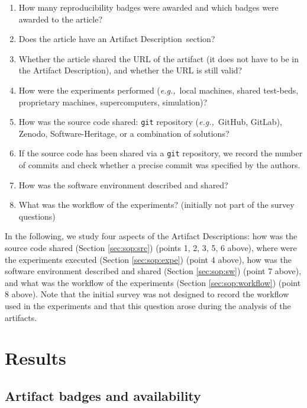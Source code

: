 \documentclass[sigconf,natbib=false]{acmart}
\newcommand{\eg}{\emph{e.g.,}}
\newcommand{\ad}{Artifact Description}
\begin{document}

\begin{enumerate}
  \item How many reproducibility badges were awarded and which badges were awarded to the article?
  \item Does the article have an \ad\ section?
  \item Whether the article shared the URL of the artifact (it does not have to be in the \ad), and whether the URL is still valid?
  \item How were the experiments performed (\eg\ local machines, shared test-beds, proprietary machines, supercomputers, simulation)?
  \item How was the source code shared: \texttt{git} repository (\eg\ GitHub, GitLab), Zenodo, Software-Heritage, or a combination of solutions?
  \item If the source code has been shared via a \texttt{git} repository, we record the number of commits and check whether a precise commit was specified by the authors.
  \item How was the software environment described and shared?
  \item What was the workflow of the experiments? (initially not part of the survey questions)
\end{enumerate}

In the following, we study four aspects of the \ad s: 
how was the source code shared (Section \ref{sec:sop:src}) (points 1, 2, 3, 5, 6 above), 
where were the experiments executed (Section \ref{sec:sop:expe}) (point 4 above), 
how was the software environment described and shared (Section \ref{sec:sop:sw}) (point 7 above), and 
what was the workflow of the experiments (Section \ref{sec:sop:workflow}) (point 8 above). 
Note that the initial survey was not designed to record the workflow used in the experiments and that this question arose during the analysis of the artifacts. 

\section{Results}\label{sec:sop}

\subsection{Artifact badges and availability}\label{sec:ad-badges}
\end{document}
